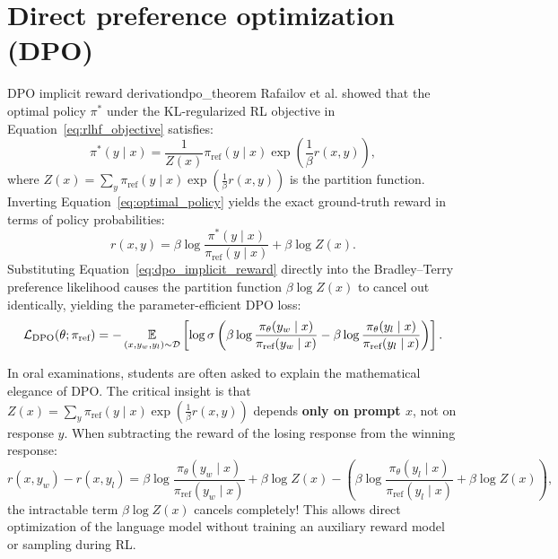 \documentclass[../../main.tex]{subfiles}
\begin{document}
\section{Direct preference optimization (DPO)}
\begin{theorem}{DPO implicit reward derivation}{dpo_theorem}
Rafailov et al. \citep{rafailov2023} showed that the optimal policy $\pi^*$ under the KL-regularized RL objective in Equation~\eqref{eq:rlhf_objective} satisfies:
\begin{equation}
\label{eq:optimal_policy}
\pi^*(y \mid x) = \frac{1}{Z(x)} \pi_{\text{ref}}(y \mid x) \exp\left( \frac{1}{\beta} r(x, y) \right),
\end{equation}
where $Z(x) = \sum_y \pi_{\text{ref}}(y \mid x) \exp\left( \frac{1}{\beta} r(x, y) \right)$ is the partition function.
Inverting Equation~\eqref{eq:optimal_policy} yields the exact ground-truth reward in terms of policy probabilities:
\begin{equation}
\label{eq:dpo_implicit_reward}
r(x, y) = \beta \log \frac{\pi^*(y \mid x)}{\pi_{\text{ref}}(y \mid x)} + \beta \log Z(x).
\end{equation}
Substituting Equation~\eqref{eq:dpo_implicit_reward} directly into the Bradley--Terry preference likelihood causes the partition function $\beta \log Z(x)$ to cancel out identically, yielding the parameter-efficient DPO loss:
\begin{equation}
\mathcal{L}_{\text{DPO}}(\theta; \pi_{\text{ref}}) = -\operatorname*{\mathbb{E}}_{(x, y_w, y_l) \sim \mathcal{D}} \left[ \log \sigma\left( \beta \log \frac{\pi_\theta(y_w \mid x)}{\pi_{\text{ref}}(y_w \mid x)} - \beta \log \frac{\pi_\theta(y_l \mid x)}{\pi_{\text{ref}}(y_l \mid x)} \right) \right].
\end{equation}
\end{theorem}

\begin{examinsight}
In oral examinations, students are often asked to explain the mathematical elegance of DPO.
The critical insight is that $Z(x) = \sum_y \pi_{\text{ref}}(y \mid x) \exp(\frac{1}{\beta} r(x, y))$ depends \textbf{only on prompt $x$}, not on response $y$.
When subtracting the reward of the losing response from the winning response:
\[
r(x, y_w) - r(x, y_l) = \beta \log \frac{\pi_\theta(y_w \mid x)}{\pi_{\text{ref}}(y_w \mid x)} + \beta \log Z(x) - \left( \beta \log \frac{\pi_\theta(y_l \mid x)}{\pi_{\text{ref}}(y_l \mid x)} + \beta \log Z(x) \right),
\]
the intractable term $\beta \log Z(x)$ cancels completely! This allows direct optimization of the language model without training an auxiliary reward model or sampling during RL.
\end{examinsight}
\end{document}
